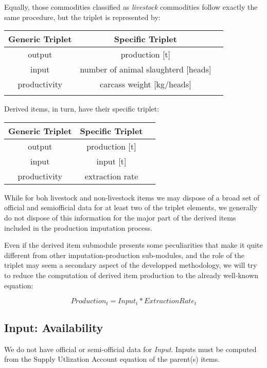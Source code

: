 \documentclass[nojss]{jss}
\newcommand{\head}[1]{\textnormal{\textbf{#1}}}
\begin{document}
Equally, those commodities classified as \textit{livestock} commodities follow exactly  the same procedure, but the triplet is represented by:

\bigskip


\begin{tabular}{ccc}
  \toprule[1.5pt]
  \head{Generic Triplet} & \head{Specific Triplet} \\
  \midrule
  output       & production [t]      \\
  input        & number of animal slaughterd [heads]\\
  productivity & carcass weight [kg/heads]        \\
  \bottomrule[1.5pt]
   \caption{\textit{Livestock Item Production Triplet}}
\end{tabular}


\bigskip


Derived items, in turn, have their specific triplet: 

\bigskip


\begin{tabular}{ccc}
  \toprule[1.5pt]
  \head{Generic Triplet} & \head{Specific Triplet} \\
  \midrule
  output       & production [t]      \\
  input        & input [t]\\
  productivity & extraction rate         \\
  \bottomrule[1.5pt]
\end{tabular}


\bigskip


While for boh livestock and non-livestock items we may dispose of a broad set of official and semiofficial data for at least two of the triplet elements, we generally do not dispose of this information for the major part of the derived items  included in the production imputation process.

Even if the derived item submodule presents some peculiarities that make it quite different from other imputation-production sub-modules, and the role of the triplet may seem a secondary aspect of the developped methodology, we will try to reduce the computation of derived item production to the already well-known equation: 

 \begin{dmath*}
 Production_{t}=Input_{t}*ExtractionRate_{t}
 \end{dmath*}


\subsection{Input: Availability}
We do not have official or semi-official data for \textit{Input}. Inputs must be computed from the Supply Utlization Account equation of the parent(s) items. 
\end{document}
